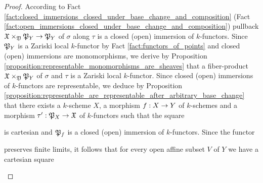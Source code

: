 \begin{proof}
According to Fact \ref{fact:closed_immersions_closed_under_base_change_and_composition} (Fact \ref{fact:open_immersions_closed_under_base_change_and_composition}) pullback $\fX\times_{\fY}\fP_Y\ra \fP_Y$ of $\sigma$ along $\tau$ is a closed (open) immersion of $k$-functors. Since $\fP_Y$ is a Zariski local $k$-functor by Fact \ref{fact:functors_of_points} and closed (open) immersions are monomorphisms, we derive by Proposition \ref{proposition:representable_monomorphisms_are_sheaves} that a fiber-product $\fX\times_{\fY}\fP_Y$ of $\sigma$ and $\tau$ is a Zariski local $k$-functor. Since closed (open) immersions of $k$-functors are representable, we deduce by Proposition \ref{proposition:representable_are_representable_after_arbitrary_base_change} that there exists a $k$-scheme $X$, a morphism $f:X\ra Y$ of $k$-schemes and a morphism $\tau':\fP_X\ra \fX$ of $k$-functors such that the square
\begin{center}
\end{center}
is cartesian and $\fP_f$ is a closed (open) immersion of $k$-functors. Since the functor
\begin{center}
\end{center}
preserves finite limits, it follows that for every open affine subset $V$ of $Y$ we have a cartesian square
\begin{center}
\begin{tikzpicture}

\end{tikzpicture}
\end{center}
\end{proof}
